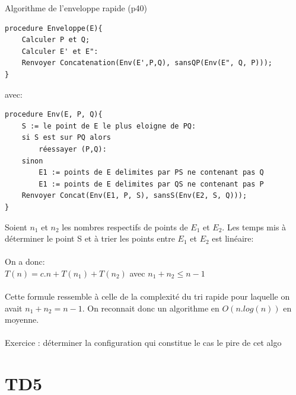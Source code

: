 \begin{exercice}{Algorithme de l'enveloppe rapide (p40)}
\begin{verbatim}
procedure Enveloppe(E){
	Calculer P et Q;
	Calculer E' et E":
	Renvoyer Concatenation(Env(E',P,Q), sansQP(Env(E", Q, P)));
}
\end{verbatim}

avec:

\begin{verbatim}
procedure Env(E, P, Q){
	S := le point de E le plus eloigne de PQ:
	si S est sur PQ alors
		réessayer (P,Q):
	sinon
		E1 := points de E delimites par PS ne contenant pas Q
		E1 := points de E delimites par QS ne contenant pas P
	Renvoyer Concat(Env(E1, P, S), sansS(Env(E2, S, Q)));
}
\end{verbatim}

Soient $n_1$ et $n_2$ les nombres respectifs de points de $E_1$ et $E_2$. Les temps mis à déterminer le point S et à trier les points entre $E_1$ et $E_2$ est linéaire:\\\\

On a donc:\\
$T(n) = c.n + T(n_1) + T(n_2)$ avec $n_1 + n_2 \leq n-1$\\\\

Cette formule ressemble à celle de la complexité du tri rapide pour laquelle on avait $n_1 + n_2 = n - 1$. On reconnait donc un algorithme en $O(n.log(n))$ en moyenne.\\\\

Exercice : déterminer la configuration qui constitue le cas le pire de cet algo

\end{exercice}

\section{TD5}

